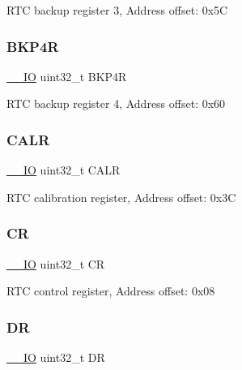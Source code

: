 R\+TC backup register 3, Address offset\+: 0x5C \mbox{\label{struct_r_t_c___type_def_ab13e106cc2eca92d1f4022df3bfdbcd7}} 
\subsubsection{\texorpdfstring{B\+K\+P4R}{BKP4R}}
{\footnotesize\ttfamily \hyperlink{core__sc300_8h_aec43007d9998a0a0e01faede4133d6be}{\+\_\+\+\_\+\+IO} uint32\+\_\+t B\+K\+P4R}

R\+TC backup register 4, Address offset\+: 0x60 \mbox{\label{struct_r_t_c___type_def_a2ce7c3842792c506635bb87a21588b58}} 
\subsubsection{\texorpdfstring{C\+A\+LR}{CALR}}
{\footnotesize\ttfamily \hyperlink{core__sc300_8h_aec43007d9998a0a0e01faede4133d6be}{\+\_\+\+\_\+\+IO} uint32\+\_\+t C\+A\+LR}

R\+TC calibration register, Address offset\+: 0x3C \mbox{\label{struct_r_t_c___type_def_ab40c89c59391aaa9d9a8ec011dd0907a}} 
\subsubsection{\texorpdfstring{CR}{CR}}
{\footnotesize\ttfamily \hyperlink{core__sc300_8h_aec43007d9998a0a0e01faede4133d6be}{\+\_\+\+\_\+\+IO} uint32\+\_\+t CR}

R\+TC control register, Address offset\+: 0x08 \mbox{\label{struct_r_t_c___type_def_a3df0d8dfcd1ec958659ffe21eb64fa94}} 
\subsubsection{\texorpdfstring{DR}{DR}}
{\footnotesize\ttfamily \hyperlink{core__sc300_8h_aec43007d9998a0a0e01faede4133d6be}{\+\_\+\+\_\+\+IO} uint32\+\_\+t DR}

